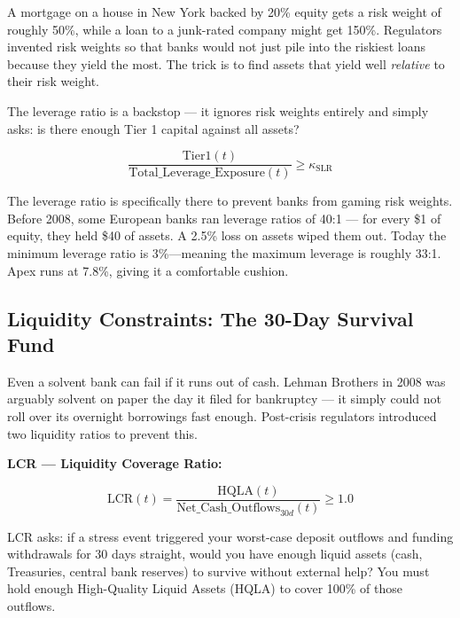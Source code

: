 \documentclass[12pt,a4paper]{article}
\begin{document}
\begin{mdframed}[style=analogy]
A mortgage on a house in New York backed by 20\% equity gets a risk weight
of roughly 50\%, while a loan to a junk-rated company might get 150\%.
Regulators invented risk weights so that banks would not just pile into the
riskiest loans because they yield the most.  The trick is to find assets that
yield well \emph{relative} to their risk weight.
\end{mdframed}

The leverage ratio is a backstop --- it ignores risk weights entirely and
simply asks: is there enough Tier 1 capital against all assets?

\begin{equation}
  \frac{\text{Tier1}(t)}{\text{Total\_Leverage\_Exposure}(t)} \geq \kappa_{\text{SLR}}
  \label{eq:slr}
\end{equation}

\begin{mdframed}[style=casestudy]
The leverage ratio is specifically there to prevent banks from gaming risk
weights.  Before 2008, some European banks ran leverage ratios of 40:1 ---
for every \$1 of equity, they held \$40 of assets.  A 2.5\% loss on assets
wiped them out.  Today the minimum leverage ratio is 3\%---meaning the maximum
leverage is roughly 33:1.  Apex runs at 7.8\%, giving it a comfortable cushion.
\end{mdframed}

\subsection{Liquidity Constraints: The 30-Day Survival Fund}

Even a solvent bank can fail if it runs out of cash.  Lehman Brothers in 2008
was arguably solvent on paper the day it filed for bankruptcy --- it simply
could not roll over its overnight borrowings fast enough.  Post-crisis
regulators introduced two liquidity ratios to prevent this.

\textbf{LCR --- Liquidity Coverage Ratio:}

\begin{equation}
  \text{LCR}(t) = \frac{\text{HQLA}(t)}{\text{Net\_Cash\_Outflows}_{30d}(t)} \geq 1.0
  \label{eq:lcr}
\end{equation}

\begin{mdframed}[style=plainenglish]
LCR asks: if a stress event triggered your worst-case deposit outflows and
funding withdrawals for 30 days straight, would you have enough liquid assets
(cash, Treasuries, central bank reserves) to survive without external help?
You must hold enough High-Quality Liquid Assets (HQLA) to cover 100\% of
those outflows.
\end{mdframed}
\end{document}
